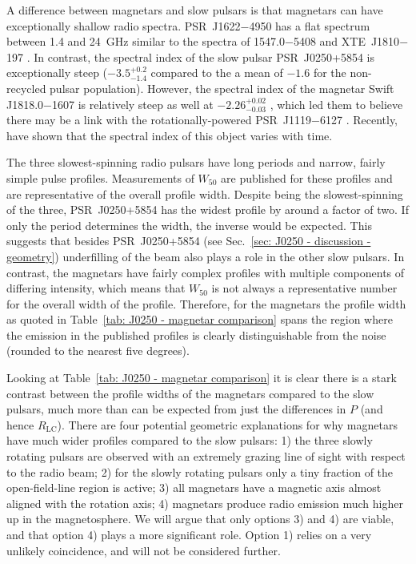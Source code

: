 A difference between magnetars and slow pulsars is that magnetars can have exceptionally shallow radio spectra. PSR~J1622$-$4950 has a flat spectrum between 1.4 and 24~GHz \citep{KJLB2011} similar to the spectra of 1547.0$-$5408 and XTE~J1810$-$197 \citep{CRJ+2007b, CRHR2007a, KSJ+2007}. In contrast, the spectral index of the slow pulsar PSR~J0250+5854 is exceptionally steep ($-3.5^{+0.2}_{-1.4}$ compared to the a mean of $-1.6$ for the non-recycled pulsar population). However, the spectral index of the magnetar Swift J1818.0$-$1607 is relatively steep as well at $-2.26^{+0.02}_{-0.03}$ \citep{LSJB2020}, which led them to believe there may be a link with the rotationally-powered PSR~J1119$-$6127 \citep[e.g][]{MPD+2017,DJW+2018}. Recently, \citet{CCC+2020} have shown that the spectral index of this object varies with time. 

The three slowest-spinning radio pulsars have long periods and narrow, fairly simple pulse profiles. Measurements of $W_{50}$ are published for these profiles and are representative of the overall profile width. Despite being the slowest-spinning of the three, PSR~J0250+5854 has the widest profile by around a factor of two. If only the period determines the width, the inverse would be expected. This suggests that besides PSR~J0250+5854 (see Sec.~\ref{sec: J0250 - discussion - geometry}) underfilling of the beam also plays a role in the other slow pulsars. In contrast, the magnetars have fairly complex profiles with multiple components of differing intensity, which means that $W_{50}$ is not always a representative number for the overall width of the profile. Therefore, for the magnetars the profile width as quoted in Table~\ref{tab: J0250 - magnetar comparison} spans the region where the emission in the published profiles is clearly distinguishable from the noise (rounded to the nearest five degrees).

Looking at Table~\ref{tab: J0250 - magnetar comparison} it is clear there is a stark contrast between the profile widths of the magnetars compared to the slow pulsars, much more than can be expected from just the differences in $P$ (and hence $R_\mathrm{LC}$). There are four potential geometric explanations for why magnetars have much wider profiles compared to the slow pulsars: 1) the three slowly rotating pulsars are observed with an extremely grazing line of sight with respect to the radio beam; 2) for the slowly rotating pulsars only a tiny fraction of the open-field-line region is active; 3) all magnetars have a magnetic axis almost aligned with the rotation axis; 4) magnetars produce radio emission much higher up in the magnetosphere. We will argue that only options 3) and 4) are viable, and that option 4) plays a more significant role. Option 1) relies on a very unlikely coincidence, and will not be considered further. 

